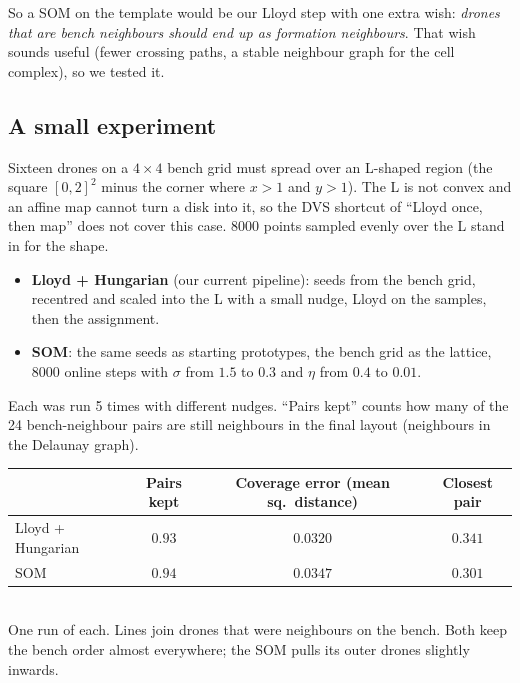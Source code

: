 \documentclass[11pt,a4paper]{article}
\begin{document}
So a SOM on the template would be our Lloyd step with one extra wish: \emph{drones that are bench neighbours should
end up as formation neighbours}. That wish sounds useful (fewer crossing paths, a stable neighbour graph for the cell
complex), so we tested it.

\subsection{A small experiment}
Sixteen drones on a $4\times4$ bench grid must spread over an L-shaped region (the square $[0,2]^2$ minus the corner
where $x>1$ and $y>1$). The L is not convex and an affine map cannot turn a disk into it, so the DVS shortcut of
``Lloyd once, then map'' does not cover this case. 8000 points sampled evenly over the L stand in for the shape.
\begin{itemize}[leftmargin=*]
\item \textbf{Lloyd + Hungarian} (our current pipeline): seeds from the bench grid, recentred and scaled into the L
with a small nudge, Lloyd on the samples, then the assignment.
\item \textbf{SOM}: the same seeds as starting prototypes, the bench grid as the lattice, $8000$ online steps with
$\sigma$ from $1.5$ to $0.3$ and $\eta$ from $0.4$ to $0.01$.
\end{itemize}
Each was run 5 times with different nudges. ``Pairs kept'' counts how many of the 24 bench-neighbour pairs are still
neighbours in the final layout (neighbours in the Delaunay graph).

\begin{center}\small
\begin{tabular}{@{}lccc@{}}
\toprule
& Pairs kept & Coverage error (mean sq.\ distance) & Closest pair\\
\midrule
Lloyd + Hungarian & $0.93$ & $\mathbf{0.0320}$ & $\mathbf{0.341}$\\
SOM & $0.94$ & $0.0347$ & $0.301$\\
\bottomrule
\end{tabular}
\end{center}

\begin{center}
\\
\small One run of each. Lines join drones that were neighbours on the bench. Both keep the bench order almost
everywhere; the SOM pulls its outer drones slightly inwards.
\end{center}
\end{document}
